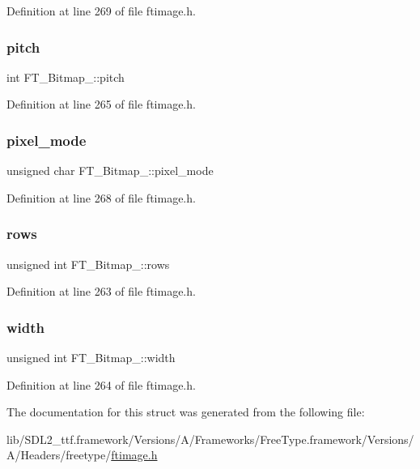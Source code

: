 Definition at line 269 of file ftimage.\+h.

\mbox{\label{struct_f_t___bitmap___afdee595846e1188c7a76d0cec9d85cf2}} 
\subsubsection{\texorpdfstring{pitch}{pitch}}
{\footnotesize\ttfamily int F\+T\+\_\+\+Bitmap\+\_\+\+::pitch}



Definition at line 265 of file ftimage.\+h.

\mbox{\label{struct_f_t___bitmap___a9bf1180f0b73c4161305ff0166f2652f}} 
\subsubsection{\texorpdfstring{pixel\_mode}{pixel\_mode}}
{\footnotesize\ttfamily unsigned char F\+T\+\_\+\+Bitmap\+\_\+\+::pixel\+\_\+mode}



Definition at line 268 of file ftimage.\+h.

\mbox{\label{struct_f_t___bitmap___ad857f33f4d12be88746072a7e1455270}} 
\subsubsection{\texorpdfstring{rows}{rows}}
{\footnotesize\ttfamily unsigned int F\+T\+\_\+\+Bitmap\+\_\+\+::rows}



Definition at line 263 of file ftimage.\+h.

\mbox{\label{struct_f_t___bitmap___a4a3dd62109eb0371f4ca8d196f713e4b}} 
\subsubsection{\texorpdfstring{width}{width}}
{\footnotesize\ttfamily unsigned int F\+T\+\_\+\+Bitmap\+\_\+\+::width}



Definition at line 264 of file ftimage.\+h.



The documentation for this struct was generated from the following file\+:\begin{DoxyCompactItemize}
\item 
lib/\+S\+D\+L2\+\_\+ttf.\+framework/\+Versions/\+A/\+Frameworks/\+Free\+Type.\+framework/\+Versions/\+A/\+Headers/freetype/\mbox{\hyperlink{ftimage_8h}{ftimage.\+h}}\end{DoxyCompactItemize}
